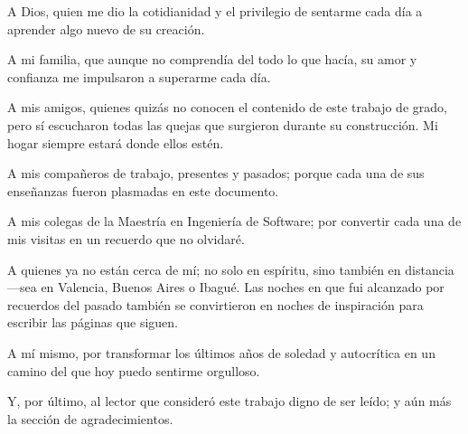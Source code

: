 \agradecimientos
{
A Dios, quien me dio la cotidianidad y el privilegio de sentarme cada día a aprender algo nuevo de su creación.

A mi familia, que aunque no comprendía del todo lo que hacía, su amor y confianza me impulsaron a superarme cada día.

A mis amigos, quienes quizás no conocen el contenido de este trabajo de grado, pero sí escucharon todas las quejas que surgieron durante su construcción. Mi hogar siempre estará donde ellos estén.

A mis compañeros de trabajo, presentes y pasados; porque cada una de sus enseñanzas fueron plasmadas en este documento.

A mis colegas de la Maestría en Ingeniería de Software; por convertir cada una de mis visitas en un recuerdo que no olvidaré.

A quienes ya no están cerca de mí; no solo en espíritu, sino también en distancia —sea en Valencia, Buenos Aires o Ibagué. Las noches en que fui alcanzado por recuerdos del pasado también se convirtieron en noches de inspiración para escribir las páginas que siguen.

A mí mismo, por transformar los últimos años de soledad y autocrítica en un camino del que hoy puedo sentirme orgulloso.

Y, por último, al lector que consideró este trabajo digno de ser leído; y aún más la sección de agradecimientos.
}
